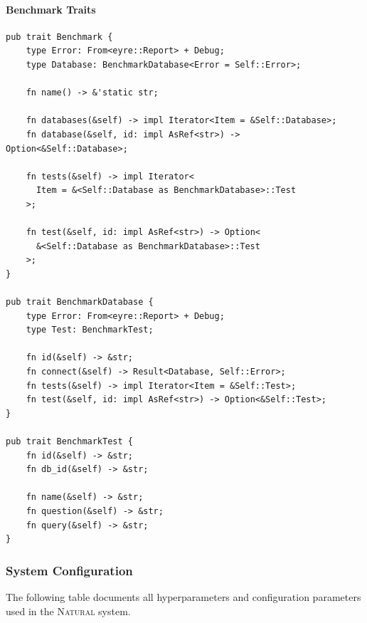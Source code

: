 \paragraph{Benchmark Traits}\label{appendix:benchmark-traits}

\begin{verbatim}
pub trait Benchmark {
    type Error: From<eyre::Report> + Debug;
    type Database: BenchmarkDatabase<Error = Self::Error>;

    fn name() -> &'static str;

    fn databases(&self) -> impl Iterator<Item = &Self::Database>;
    fn database(&self, id: impl AsRef<str>) -> Option<&Self::Database>;

    fn tests(&self) -> impl Iterator<
      Item = &<Self::Database as BenchmarkDatabase>::Test
    >;

    fn test(&self, id: impl AsRef<str>) -> Option<
      &<Self::Database as BenchmarkDatabase>::Test
    >;
}

pub trait BenchmarkDatabase {
    type Error: From<eyre::Report> + Debug;
    type Test: BenchmarkTest;

    fn id(&self) -> &str;
    fn connect(&self) -> Result<Database, Self::Error>;
    fn tests(&self) -> impl Iterator<Item = &Self::Test>;
    fn test(&self, id: impl AsRef<str>) -> Option<&Self::Test>;
}

pub trait BenchmarkTest {
    fn id(&self) -> &str;
    fn db_id(&self) -> &str;

    fn name(&self) -> &str;
    fn question(&self) -> &str;
    fn query(&self) -> &str;
}
\end{verbatim}

\subsubsection{System Configuration}\label{appendix:system-config}

The following table documents all hyperparameters and configuration parameters
used in the \textsc{Natural} system.


